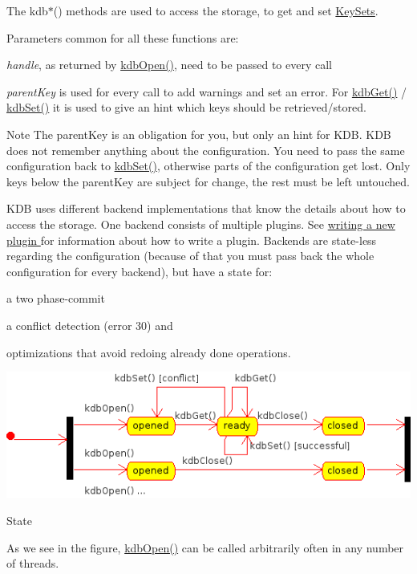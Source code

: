 The kdb$\ast$() methods are used to access the storage, to get and set \hyperlink{group__keyset}{Key\-Sets}.

Parameters common for all these functions are\-:


\begin{DoxyItemize}
\item {\itshape handle}, as returned by \hyperlink{group__kdb_ga6808defe5870f328dd17910aacbdc6ca}{kdb\-Open()}, need to be passed to every call
\item {\itshape parent\-Key} is used for every call to add warnings and set an error. For \hyperlink{group__kdb_ga28e385fd9cb7ccfe0b2f1ed2f62453a1}{kdb\-Get()} / \hyperlink{group__kdb_ga11436b058408f83d303ca5e996832bcf}{kdb\-Set()} it is used to give an hint which keys should be retrieved/stored.
\end{DoxyItemize}

\begin{DoxyNote}{Note}
The parent\-Key is an obligation for you, but only an hint for K\-D\-B. K\-D\-B does not remember anything about the configuration. You need to pass the same configuration back to \hyperlink{group__kdb_ga11436b058408f83d303ca5e996832bcf}{kdb\-Set()}, otherwise parts of the configuration get lost. Only keys below the parent\-Key are subject for change, the rest must be left untouched.
\end{DoxyNote}
K\-D\-B uses different backend implementations that know the details about how to access the storage. One backend consists of multiple plugins. See \hyperlink{group__plugin}{writing a new plugin } for information about how to write a plugin. Backends are state-\/less regarding the configuration (because of that you must pass back the whole configuration for every backend), but have a state for\-:


\begin{DoxyItemize}
\item a two phase-\/commit
\item a conflict detection (error 30) and
\item optimizations that avoid redoing already done operations.
\end{DoxyItemize}


\begin{DoxyImage}
\includegraphics{state.png}
\caption{State}
\end{DoxyImage}
 As we see in the figure, \hyperlink{group__kdb_ga6808defe5870f328dd17910aacbdc6ca}{kdb\-Open()} can be called arbitrarily often in any number of threads.

